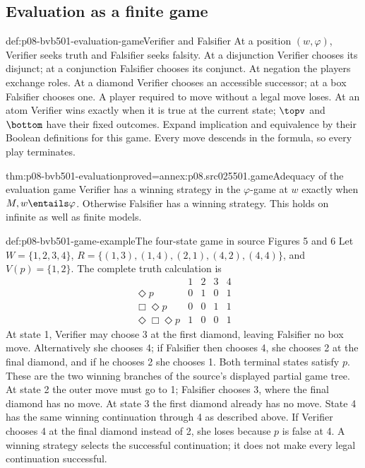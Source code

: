 \subsection{Evaluation as a finite game}
\label{sec:p08-bvb501-evaluation-games}

\begin{hbdefinition}{def:p08-bvb501-evaluation-game}{Verifier and Falsifier}
At a position \((w,\varphi)\), Verifier seeks truth and Falsifier seeks
falsity. At a disjunction Verifier chooses its disjunct; at a conjunction
Falsifier chooses its conjunct. At negation the players exchange roles.
At a diamond Verifier chooses an accessible successor; at a box Falsifier
chooses one. A player required to move without a legal move loses.
At an atom Verifier wins exactly when it is true at the current state;
\(\topv\) and \(\bottom\) have their fixed outcomes. Expand
implication and equivalence by their Boolean definitions for this game.
Every move descends in the formula, so every play terminates.
\end{hbdefinition}

\begin{hbtheorem}{thm:p08-bvb501-evaluation}{proved=annex:p08.src025501.game}{Adequacy of the evaluation game}
Verifier has a winning strategy in the \(\varphi\)-game at \(w\)
exactly when \(M,w\entails\varphi\). Otherwise Falsifier has a winning
strategy. This holds on infinite as well as finite models.
\end{hbtheorem}

\begin{hbexample}{def:p08-bvb501-game-example}{The four-state game in source Figures 5 and 6}
Let \(W=\{1,2,3,4\}\),
\(R=\{(1,3),(1,4),(2,1),(4,2),(4,4)\}\), and
\(V(p)=\{1,2\}\). The complete truth calculation is
\[
\begin{array}{c|cccc}
 &1&2&3&4\\\hline
 \Diamond p&0&1&0&1\\
 \Box\Diamond p&0&0&1&1\\
 \Diamond\Box\Diamond p&1&0&0&1
\end{array}
\]
At state 1, Verifier may choose 3 at the first diamond, leaving Falsifier
no box move. Alternatively she chooses 4; if Falsifier then chooses 4,
she chooses 2 at the final diamond, and if he chooses 2 she chooses 1.
Both terminal states satisfy \(p\). These are the two winning branches
of the source's displayed partial game tree. At state 2 the outer move
must go to 1; Falsifier chooses 3, where the final diamond has no move.
At state 3 the first diamond already has no move. State 4 has the same
winning continuation through 4 as described above.
If Verifier chooses 4 at the final diamond instead of 2, she loses because
\(p\) is false at 4. A winning strategy selects the successful continuation;
it does not make every legal continuation successful.
\end{hbexample}

